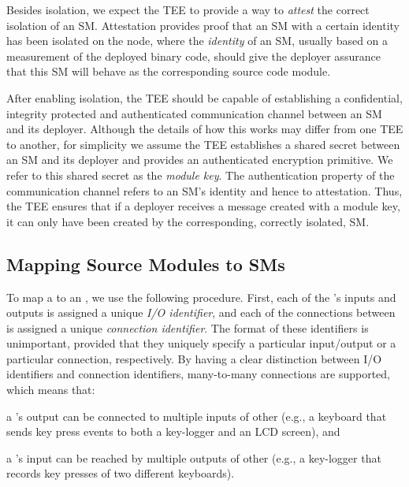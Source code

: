 \label{concept:attestation}
%
Besides isolation, we expect the \ac{TEE} to provide a way to \emph{attest}
the correct isolation of an \ac{SM}.
%
\label{concept:pm-identity}
%
Attestation provides proof that an \ac{SM} with a certain identity has been
isolated on the node, where the \emph{identity} of an \ac{SM}, usually based on a measurement of the deployed binary code, should give
the deployer assurance that this \ac{SM} will behave as the corresponding
source code module.

\label{concept:secure-communication}
%
After enabling isolation, the \ac{TEE} should be capable of establishing a
confidential, integrity protected and authenticated communication channel
between an \ac{SM} and its deployer.  Although the details of how this works may
differ from one \ac{TEE} to another, for simplicity we assume the \ac{TEE}
establishes a shared secret between an \ac{SM} and its deployer and provides an
authenticated encryption primitive.  We refer to this shared secret as the
\emph{module key}.  The authentication property of the communication channel
refers to an \ac{SM}'s identity and hence to attestation.  Thus, the \ac{TEE}
ensures that if a deployer receives a message created with a module key, it can
only have been created by the corresponding, correctly isolated, \ac{SM}.

\subsection{Mapping Source Modules to SMs}
\label{concept:compilation}
%
To map a \reactmod{} to an \protmod, we use the following procedure.  First,
each of the \reactmod's inputs and outputs is assigned a unique \emph{I/O
identifier}, and each of the connections between \reactmods{} is assigned a
unique \emph{connection identifier}. The format of these identifiers is
unimportant, provided that they uniquely specify a particular input/output or a
particular connection, respectively. By having a clear distinction between I/O
identifiers and connection identifiers, many-to-many connections are supported,
which means that:
%
\begin{paraenum}
    \item a \reactmod's output can be connected to multiple inputs of
    other \reactmods{} (e.g., a keyboard that sends key press events to both
    a key-logger and an LCD screen), and
    \item a \reactmod's input can be reached by
    multiple outputs of other \reactmods{} (e.g., a key-logger that records
    key presses of two different keyboards).
  \end{paraenum}


